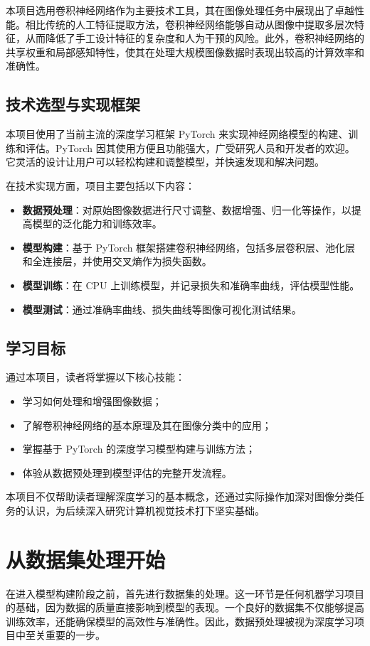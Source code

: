 本项目选用卷积神经网络作为主要技术工具，其在图像处理任务中展现出了卓越性能。相比传统的人工特征提取方法，卷积神经网络能够自动从图像中提取多层次特征，从而降低了手工设计特征的复杂度和人为干预的风险。此外，卷积神经网络的共享权重和局部感知特性，使其在处理大规模图像数据时表现出较高的计算效率和准确性。

\subsection{技术选型与实现框架}

本项目使用了当前主流的深度学习框架 PyTorch 来实现神经网络模型的构建、训练和评估。PyTorch 因其使用方便且功能强大，广受研究人员和开发者的欢迎。它灵活的设计让用户可以轻松构建和调整模型，并快速发现和解决问题。

在技术实现方面，项目主要包括以下内容：
\begin{itemize}
    \item \textbf{数据预处理}：对原始图像数据进行尺寸调整、数据增强、归一化等操作，以提高模型的泛化能力和训练效率。
    \item \textbf{模型构建}：基于 PyTorch 框架搭建卷积神经网络，包括多层卷积层、池化层和全连接层，并使用交叉熵作为损失函数。
    \item \textbf{模型训练}：在 CPU 上训练模型，并记录损失和准确率曲线，评估模型性能。
    \item \textbf{模型测试}：通过准确率曲线、损失曲线等图像可视化测试结果。
\end{itemize}

\subsection{学习目标}

通过本项目，读者将掌握以下核心技能：
\begin{itemize}
    \item 学习如何处理和增强图像数据；
    \item 了解卷积神经网络的基本原理及其在图像分类中的应用；
    \item 掌握基于 PyTorch 的深度学习模型构建与训练方法；
    \item 体验从数据预处理到模型评估的完整开发流程。
\end{itemize}

本项目不仅帮助读者理解深度学习的基本概念，还通过实际操作加深对图像分类任务的认识，为后续深入研究计算机视觉技术打下坚实基础。

\section{从数据集处理开始}
在进入模型构建阶段之前，首先进行数据集的处理。这一环节是任何机器学习项目的基础，因为数据的质量直接影响到模型的表现。一个良好的数据集不仅能够提高训练效率，还能确保模型的高效性与准确性。因此，数据预处理被视为深度学习项目中至关重要的一步。


